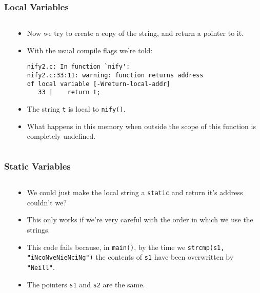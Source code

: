 \begin{frame}[fragile]
\frametitle{Local Variables}
\begin{columns}[T]

\begin{column}{0.35\textwidth}

\end{column}

\pause
\begin{column}{0.55\textwidth}
\begin{itemize}[<+->]
\item Now we try to create a copy of the string, and return a pointer to it.
\item With the usual compile flags we're told:
\begin{verbatim}
nify2.c: In function `nify':
nify2.c:33:11: warning: function returns address
of local variable [-Wreturn-local-addr]
   33 |    return t;
\end{verbatim}
\item The string \verb^t^ is local to \verb^nify()^.
\item What happens in this memory when outside the scope of this function is completely undefined.
\end{itemize}
\end{column}

\end{columns}
\end{frame}


\begin{frame}[fragile]
\frametitle{Static Variables}
\begin{columns}[T]

\begin{column}{0.35\textwidth}

\end{column}

\pause
\begin{column}{0.55\textwidth}
\begin{itemize}[<+->]
\item We could just make the local string a \verb^static^ and return it's address couldn't we?
\item This only works if we're very careful with the order in which we use the strings.
\item This code fails because, in \verb^main()^, by the time we \verb^strcmp(s1, "iNcoNveNieNciNg")^ the contents of \verb^s1^ have been overwritten by \verb^"Neill"^. 
\item The pointers \verb^s1^ and \verb^s2^ are the same.
\end{itemize}
\end{column}

\end{columns}
\end{frame}

